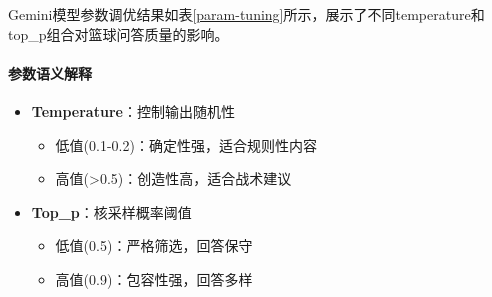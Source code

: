 \documentclass{article}
\theoremstyle{plain}
\theoremstyle{definition}
\theoremstyle{remark}
\begin{document}
Gemini模型参数调优结果如表\ref{param-tuning}所示，展示了不同temperature和top\_p组合对篮球问答质量的影响。

\begin{table}[t]
\caption{Gemini模型参数调优结果（篮球问答场景）}
\label{param-tuning}
\vskip 0.15in
\begin{center}
\begin{small}
\begin{sc}
\end{sc}
\end{small}
\end{center}
\vskip -0.1in
\end{table}

\paragraph{参数语义解释}
\begin{itemize}
\item \textbf{Temperature}：控制输出随机性
  \begin{itemize}
  \item 低值(0.1-0.2)：确定性强，适合规则性内容
  \item 高值(>0.5)：创造性高，适合战术建议
  \end{itemize}
  
\item \textbf{Top\_p}：核采样概率阈值
  \begin{itemize}
  \item 低值(0.5)：严格筛选，回答保守
  \item 高值(0.9)：包容性强，回答多样
  \end{itemize}
\end{itemize}
\end{document}
